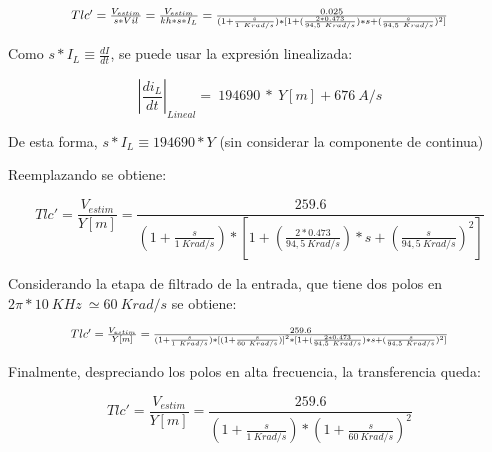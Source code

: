 \begin{equation} \label{eq_TLC_deriv_3}
	\resizebox{.8\hsize}{!}
	{
	$
	{Tlc'}=\frac{V_{estim}}{s*Vil}=\frac{V_{estim}}{kh*s*I_L}=\frac{0.025}{(1+\frac{s}{1\ Krad/s})*[1+(\frac{2*0.473}{94,5\ Krad/s})*s+(\frac{s}{94,5\ Krad/s})^2]}
	$
	}
\end{equation}

\noindent Como $s*I_L\equiv \frac{dI}{dt}$, se puede usar la expresi\'{o}n linealizada:

\begin{equation} \label{eq_TLC_deriv_4}
	{\left|\frac{{di}_L}{dt}\right|}_{Lineal}=\ 194690\ *\ Y[m]+676\ A/s
\end{equation}

\noindent De esta forma,  $s*I_L\equiv 194690*Y$ (sin considerar la componente de continua)

\noindent Reemplazando se obtiene:

\begin{equation} \label{eq_TLC_deriv_5}
	{Tlc'}=\frac{V_{estim}}{Y[m]}=\frac{259.6}{(1+\frac{s}{1\ Krad/s})*[1+(\frac{2*0.473}{94,5\ Krad/s})*s+(\frac{s}{94,5\ Krad/s})^2]}
\end{equation}

\noindent Considerando la etapa de filtrado de la entrada, que tiene dos polos en $2\pi *10\ KHz\ \simeq 60\ Krad/s$ se obtiene:

\begin{equation} \label{eq_TLC_deriv_6}
	\resizebox{.8\hsize}{!}
	{
		$
	{Tlc'}=\frac{V_{estim}}{Y[m]}=\frac{259.6}{(1+\frac{s}{1\ Krad/s})*{[(1+\frac{s}{60\ Krad/s})]}^2*[1+(\frac{2*0.473}{94,5\ Krad/s})*s+(\frac{s}{94,5\ Krad/s})^2]}
	$
	}
\end{equation}

\noindent Finalmente, despreciando los polos en alta frecuencia, la transferencia queda:

\begin{equation} \label{eq_TLC_deriv_7}
	{Tlc'}=\frac{V_{estim}}{Y[m]}=\frac{259.6}{(1+\frac{s}{1\ Krad/s})*{(1+\frac{s}{60\ Krad/s})}^2}
\end{equation}